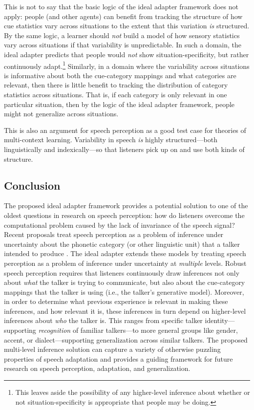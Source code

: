 This is not to say that the basic logic of the ideal adapter framework does not apply: people (and other agents) can benefit from tracking the structure of how cue statistics vary across situations to the extent that this variation \emph{is} structured.  By the same logic, a learner should \emph{not} build a model of how sensory statistics vary across situations if that variability is unpredictable.  In such a domain, the ideal adapter predicts that people would \emph{not} show situation-specificity, but rather continuously adapt.\footnote{This leaves aside the possibility of any higher-level inference about whether or not situation-specificity is appropriate that people may be doing.}  Similarly, in a domain where the variability across situations is informative about both the cue-category mappings and what categories are relevant, then there is little benefit to tracking the distribution of category statistics across situations.  That is, if each category is only relevant in one particular situation, then by the logic of the ideal adapter framework, people might not generalize across situations.

This is also an argument for speech perception as a good test case for theories of multi-context learning.  Variability in speech \emph{is} highly structured---both linguistically and indexically---so that listeners pick up on and use both kinds of structure.  

\subsection{Conclusion}
\label{sec:conclusion}


The proposed ideal adapter framework provides a potential solution to one of the oldest questions in research on speech perception: how do listeners overcome the computational problem caused by the lack of invariance of the speech signal?  Recent proposals treat speech perception as a problem of inference under uncertainty about the phonetic category (or other linguistic unit) that a talker intended to produce \autocite[e.g.,][]{Clayards2008,Feldman2009a,Norris2008}.  The ideal adapter extends these models by treating speech perception as a problem of inference under uncertainty at \emph{multiple} levels. Robust speech perception requires that listeners continuously draw inferences not only about \emph{what} the talker is trying to communicate, but also about the cue-category mappings that the talker is using (i.e., the talker's generative model).  Moreover, in order to determine what previous experience is relevant in making these inferences, and how relevant it is, these inferences in turn depend on higher-level inferences about \emph{who} the talker is.  This ranges from specific talker identity---supporting \emph{recognition} of familiar talkers---to more general groups like gender, accent, or dialect---supporting generalization across similar talkers.   The proposed multi-level inference solution can capture a variety of otherwise puzzling properties of speech adaptation and provides a guiding framework for future research on speech perception, adaptation, and generalization.

